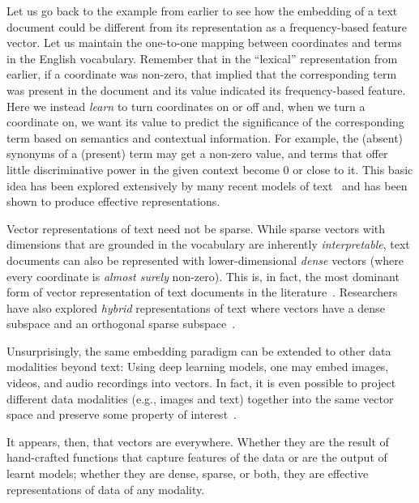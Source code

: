 Let us go back to the example from earlier to see how the embedding of a text document
could be different from its representation as a frequency-based feature vector.
Let us maintain the one-to-one mapping between coordinates
and terms in the English vocabulary. Remember that in the ``lexical'' representation from earlier,
if a coordinate was non-zero, that implied that the corresponding term was present in the document
and its value indicated its frequency-based feature. Here we instead \emph{learn} to turn
coordinates on or off and, when we turn a coordinate on, we want its value to predict the
significance of the corresponding term based on semantics and contextual information.
For example, the (absent) synonyms of a (present) term may get a non-zero value, and terms that offer
little discriminative power in the given context become $0$ or close to it.
This basic idea has been explored extensively by many recent models of text~\citep{sparterm,formal2021splade,formal2022splade,zhuang2022reneuir,dai2020sigir,coil,mallia2021learning,zamani2018cikm,unicoil}
and has been shown to produce effective representations.

Vector representations of text need not be sparse.
While sparse vectors with dimensions that are grounded in the vocabulary
are inherently \emph{interpretable}, text documents can also be represented with
lower-dimensional \emph{dense} vectors (where every coordinate is \emph{almost surely} non-zero).
This is, in fact, the most dominant form of vector representation of text
documents in the literature~\citep{lin2021pretrained,karpukhin-etal-2020-dense,xiong2021approximate,reimers-2019-sentence-bert,santhanam-etal-2022-colbertv2,colbert2020khattab}. Researchers have also explored \emph{hybrid}
representations of text where vectors have a dense subspace and an orthogonal sparse
subspace~\citep{chen2022ecir,bruch2023fusion,wang2021bert,Kuzi2020LeveragingSA,karpukhin-etal-2020-dense,Ma2021ARS,Ma2020HybridFR,Wu2019EfficientIP}.

Unsurprisingly, the same embedding paradigm can be extended to other data modalities beyond text:
Using deep learning models, one may embed images, videos, and audio recordings
into vectors. In fact, it is even possible to project different
data modalities (e.g., images and text) together into the same vector space
and preserve some property of interest~\citep{multimodal2020Zhang,guo2019multimodal}.

\begin{svgraybox}
It appears, then, that vectors are everywhere.
Whether they are the result of hand-crafted functions that
capture features of the data or are the output of learnt models;
whether they are dense, sparse, or both,
they are effective representations of data of any modality.
\end{svgraybox}


